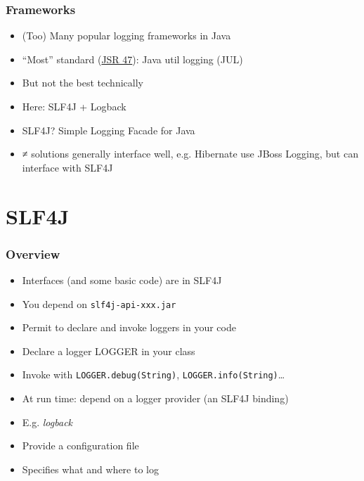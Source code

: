 \documentclass[french, english]{beamer}
\begin{document}
\begin{frame}
	\frametitle{Frameworks}
	\begin{itemize}
		\item (Too) Many popular logging frameworks in Java
		\item “Most” standard (\href{https://jcp.org/en/jsr/detail?id=47}{JSR 47}): Java util logging (JUL)
		\item But not the best technically
		\item Here: SLF4J + Logback
		\item SLF4J? \pause Simple Logging Facade for Java
		\item ≠ solutions generally interface well, e.g. Hibernate use JBoss Logging, but can interface with SLF4J
	\end{itemize}
\end{frame}

\section{SLF4J}
\begin{frame}
	\frametitle{Overview}
	\begin{itemize}
		\item Interfaces (and some basic code) are in SLF4J
		\item You depend on \texttt{slf4j-api-xxx.jar}
		\item Permit to declare and invoke loggers in your code
		\item Declare a logger LOGGER in your class
		\item Invoke with \texttt{LOGGER.debug(String)}, \texttt{LOGGER.info(String)}…
		\item At run time: depend on a logger provider (an SLF4J binding)
		\item E.g. \emph{logback}
		\item Provide a configuration file
		\item Specifies what and where to log
	\end{itemize}
\end{frame}
\end{document}
